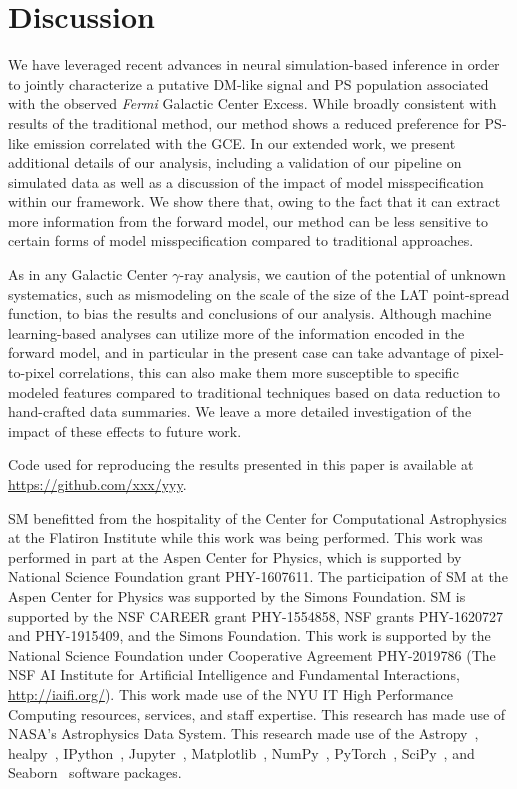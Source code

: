 \documentclass[]{article}
\newcommand{\Fermi}{\emph{Fermi}\xspace}
\begin{document}
\section{Discussion}
\label{sec:conclusions}

We have leveraged recent advances in neural simulation-based inference in order to jointly characterize a putative DM-like signal and PS population associated with the observed \Fermi Galactic Center Excess. While broadly consistent with results of the traditional method, our method shows a reduced preference for PS-like emission correlated with the GCE. In our extended work, we present additional details of our analysis, including a validation of our pipeline on simulated data as well as a discussion of the impact of model misspecification within our framework. We show there that, owing to the fact that it can extract more information from the forward model, our method can be less sensitive to certain forms of model misspecification compared to traditional approaches.

As in any Galactic Center $\gamma$-ray analysis, we caution of the potential of unknown systematics, such as mismodeling on the scale of the size of the LAT point-spread function, to bias the results and conclusions of our analysis. Although machine learning-based analyses can utilize more of the information encoded in the forward model, and in particular in the present case can take advantage of pixel-to-pixel correlations, this can also make them more susceptible to specific modeled features compared to traditional techniques based on data reduction to hand-crafted data summaries. We leave a more detailed investigation of the impact of these effects to future work.

Code used for reproducing the results presented in this paper is available at \url{https://github.com/xxx/yyy}. 

\begin{ack}
SM benefitted from the hospitality of the Center for Computational Astrophysics at the Flatiron Institute while this work was being performed. 
This work was performed in part at the Aspen Center for Physics, which is supported by National Science Foundation grant PHY-1607611.
The participation of SM at the Aspen Center for Physics was supported by the Simons Foundation.
SM is supported by the NSF CAREER grant PHY-1554858, NSF grants PHY-1620727 and PHY-1915409, and the Simons Foundation. 
This work is supported by the National Science Foundation under Cooperative Agreement PHY-2019786 (The NSF AI Institute for Artificial Intelligence and Fundamental Interactions, \url{http://iaifi.org/}).
This work made use of the NYU IT High Performance Computing resources, services, and staff expertise. 
This research has made use of NASA's Astrophysics Data System. 
This research made use of the Astropy~\cite{Robitaille:2013mpa,Price-Whelan:2018hus},
healpy~\cite{Gorski:2004by,Zonca2019},
IPython~\cite{PER-GRA:2007},
Jupyter~\cite{Kluyver2016JupyterN},
Matplotlib~\cite{Hunter:2007},
NumPy~\cite{harris_array_2020},
PyTorch~\cite{NEURIPS2019_9015},
SciPy~\cite{2020SciPy-NMeth}, and
Seaborn~\cite{michael_waskom_2017_883859}
software packages.
\end{ack}
\end{document}

